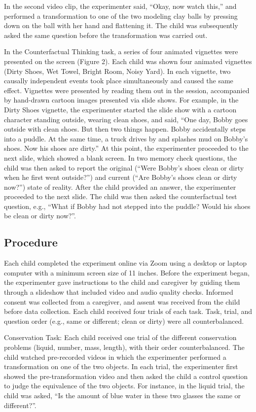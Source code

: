 \documentclass[
  doc]{apa6}
\begin{document}
In the second video clip, the experimenter said, ``Okay, now watch this,'' and performed a transformation to one of the two modeling clay balls by pressing down on the ball with her hand and flattening it. The child was subsequently asked the same question before the transformation was carried out.

In the Counterfactual Thinking task, a series of four animated vignettes were presented on the screen (Figure 2). Each child was shown four animated vignettes (Dirty Shoes, Wet Towel, Bright Room, Noisy Yard). In each vignette, two causally independent events took place simultaneously and caused the same effect. Vignettes were presented by reading them out in the session, accompanied by hand-drawn cartoon images presented via slide shows. For example, in the Dirty Shoes vignette, the experimenter started the slide show with a cartoon character standing outside, wearing clean shoes, and said, ``One day, Bobby goes outside with clean shoes. But then two things happen. Bobby accidentally steps into a puddle. At the same time, a truck drives by and splashes mud on Bobby's shoes. Now his shoes are dirty.'' At this point, the experimenter proceeded to the next slide, which showed a blank screen. In two memory check questions, the child was then asked to report the original (``Were Bobby's shoes clean or dirty when he first went outside?'') and current (``Are Bobby's shoes clean or dirty now?'') state of reality. After the child provided an answer, the experimenter proceeded to the next slide. The child was then asked the counterfactual test question, e.g., ``What if Bobby had not stepped into the puddle? Would his shoes be clean or dirty now?''.

\subsection{Procedure}\label{procedure}

Each child completed the experiment online via Zoom using a desktop or laptop computer with a minimum screen size of 11 inches. Before the experiment began, the experimenter gave instructions to the child and caregiver by guiding them through a slideshow that included video and audio quality checks. Informed consent was collected from a caregiver, and assent was received from the child before data collection. Each child received four trials of each task.
Task, trial, and question order (e.g., same or different; clean or dirty) were all counterbalanced.

Conservation Task: Each child received one trial of the different conservation problems (liquid, number, mass, length), with their order counterbalanced. The child watched pre-recorded videos in which the experimenter performed a transformation on one of the two objects. In each trial, the experimenter first showed the pre-transformation video and then asked the child a control question to judge the equivalence of the two objects.
For instance, in the liquid trial, the child was asked, ``Is the amount of blue water in these two glasses the same or different?''.
\end{document}
